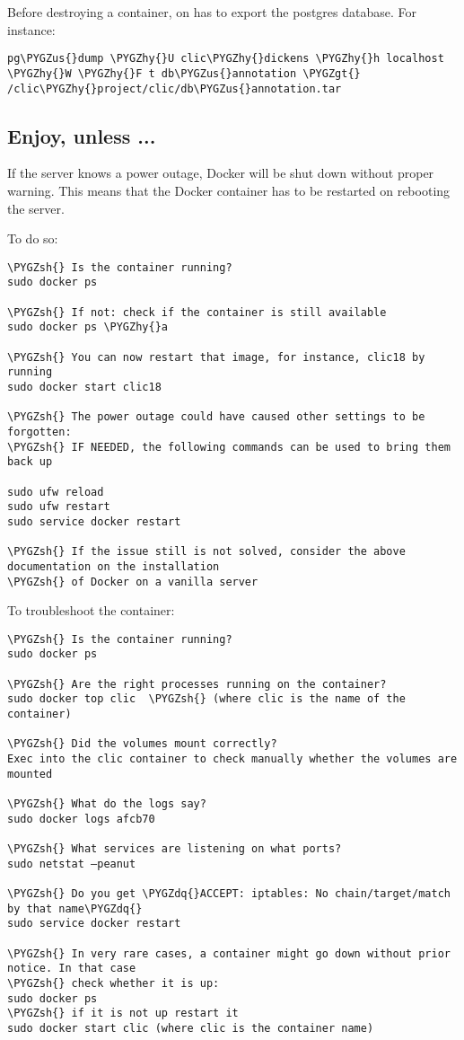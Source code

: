 \documentclass[letterpaper,10pt,english]{sphinxmanual}
\def\PYGZus{\char`\_}
\def\PYGZgt{\char`\>}
\def\PYGZsh{\char`\#}
\def\PYGZhy{\char`\-}
\def\PYGZdq{\char`\"}
\begin{document}
Before destroying a container, on has to export the postgres database. For instance:

\begin{Verbatim}[commandchars=\\\{\}]
pg\PYGZus{}dump \PYGZhy{}U clic\PYGZhy{}dickens \PYGZhy{}h localhost \PYGZhy{}W \PYGZhy{}F t db\PYGZus{}annotation \PYGZgt{} /clic\PYGZhy{}project/clic/db\PYGZus{}annotation.tar
\end{Verbatim}


\subsection{Enjoy, unless ...}
\label{admin:enjoy-unless}
If the server knows a power outage, Docker will be shut down without proper warning.
This means that the Docker container has to be restarted on rebooting the server.

To do so:

\begin{Verbatim}[commandchars=\\\{\}]
\PYGZsh{} Is the container running?
sudo docker ps

\PYGZsh{} If not: check if the container is still available
sudo docker ps \PYGZhy{}a

\PYGZsh{} You can now restart that image, for instance, clic18 by running
sudo docker start clic18

\PYGZsh{} The power outage could have caused other settings to be forgotten:
\PYGZsh{} IF NEEDED, the following commands can be used to bring them back up

sudo ufw reload
sudo ufw restart
sudo service docker restart

\PYGZsh{} If the issue still is not solved, consider the above documentation on the installation
\PYGZsh{} of Docker on a vanilla server
\end{Verbatim}

To troubleshoot the container:

\begin{Verbatim}[commandchars=\\\{\}]
\PYGZsh{} Is the container running?
sudo docker ps

\PYGZsh{} Are the right processes running on the container?
sudo docker top clic  \PYGZsh{} (where clic is the name of the container)

\PYGZsh{} Did the volumes mount correctly?
Exec into the clic container to check manually whether the volumes are mounted

\PYGZsh{} What do the logs say?
sudo docker logs afcb70

\PYGZsh{} What services are listening on what ports?
sudo netstat –peanut

\PYGZsh{} Do you get \PYGZdq{}ACCEPT: iptables: No chain/target/match by that name\PYGZdq{}
sudo service docker restart

\PYGZsh{} In very rare cases, a container might go down without prior notice. In that case
\PYGZsh{} check whether it is up:
sudo docker ps
\PYGZsh{} if it is not up restart it
sudo docker start clic (where clic is the container name)
\end{Verbatim}
\end{document}
